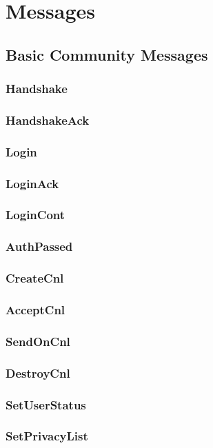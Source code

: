 \documentclass[titlepage,oneside]{book}
\begin{document}
\section{Messages}
\subsection{Basic Community Messages}
\subsubsection{Handshake}
\subsubsection{HandshakeAck}
\subsubsection{Login}
\subsubsection{LoginAck}
\subsubsection{LoginCont}
\subsubsection{AuthPassed}
\subsubsection{CreateCnl}
\subsubsection{AcceptCnl}
\subsubsection{SendOnCnl}
\subsubsection{DestroyCnl}
\subsubsection{SetUserStatus}
\subsubsection{SetPrivacyList}
\end{document}
